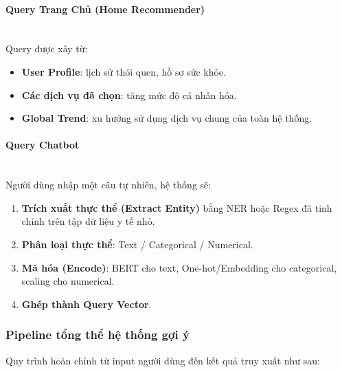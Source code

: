 \paragraph{Query Trang Chủ (Home Recommender)} \\

Query được xây từ:
\begin{itemize}
    \item \textbf{User Profile}: lịch sử thói quen, hồ sơ sức khỏe.
    \item \textbf{Các dịch vụ đã chọn}: tăng mức độ cá nhân hóa.
    \item \textbf{Global Trend}: xu hướng sử dụng dịch vụ chung của toàn hệ thống.
\end{itemize}

\paragraph{Query Chatbot} \\
Người dùng nhập một câu tự nhiên, hệ thống sẽ:
\begin{enumerate}
    \item \textbf{Trích xuất thực thể (Extract Entity)} bằng NER hoặc Regex đã tinh chỉnh trên tập dữ liệu y tế nhỏ.
    \item \textbf{Phân loại thực thể}: Text / Categorical / Numerical.
    \item \textbf{Mã hóa (Encode)}: BERT cho text, One-hot/Embedding cho categorical, scaling cho numerical.
    \item \textbf{Ghép thành Query Vector}.
\end{enumerate}

\subsubsection{Pipeline tổng thể hệ thống gợi ý}

Quy trình hoàn chỉnh từ input người dùng đến kết quả truy xuất như sau:

